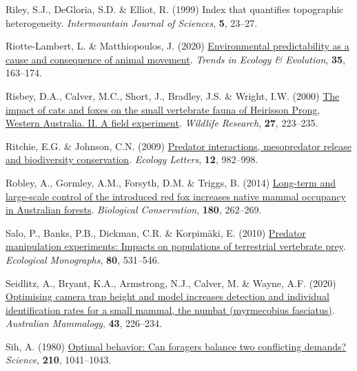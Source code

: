 \documentclass[preprint, 3p, authoryear]{elsarticle} %
\newlength{\cslhangindent}
\newlength{\cslentryspacingunit} %
\newenvironment{CSLReferences}[2] %
 {%
  \setlength{\parindent}{0pt}
  \ifodd #1
  \let\oldpar\par
  \def\par{\hangindent=\cslhangindent\oldpar}
  \fi
  \setlength{\parskip}{#2\cslentryspacingunit}
 }%
 {}
\begin{document}
\begin{CSLReferences}{1}{0}
\leavevmode{}%
Riley, S.J., DeGloria, S.D. \& Elliot, R. (1999) Index that quantifies topographic heterogeneity. \emph{Intermountain Journal of Sciences}, \textbf{5}, 23--27.

\leavevmode{}%
Riotte-Lambert, L. \& Matthiopoulos, J. (2020) \href{https://doi.org/10.1016/j.tree.2019.09.009}{Environmental predictability as a cause and consequence of animal movement}. \emph{Trends in Ecology \& Evolution}, \textbf{35}, 163--174.

\leavevmode{}%
Risbey, D.A., Calver, M.C., Short, J., Bradley, J.S. \& Wright, I.W. (2000) \href{https://doi.org/10.1071/WR98092}{The impact of cats and foxes on the small vertebrate fauna of {Heirisson Prong, Western {A}ustralia. II. A} field experiment}. \emph{Wildlife Research}, \textbf{27}, 223--235.

\leavevmode{}%
Ritchie, E.G. \& Johnson, C.N. (2009) \href{https://doi.org/10.1111/j.1461-0248.2009.01347.x}{Predator interactions, mesopredator release and biodiversity conservation}. \emph{Ecology Letters}, \textbf{12}, 982--998.

\leavevmode{}%
Robley, A., Gormley, A.M., Forsyth, D.M. \& Triggs, B. (2014) \href{https://doi.org/10.1016/j.biocon.2014.10.017}{Long-term and large-scale control of the introduced red fox increases native mammal occupancy in {{A}ustralian} forests}. \emph{Biological Conservation}, \textbf{180}, 262--269.

\leavevmode{}%
Salo, P., Banks, P.B., Dickman, C.R. \& Korpimäki, E. (2010) \href{https://doi.org/10.1890/09-1260.1}{Predator manipulation experiments: Impacts on populations of terrestrial vertebrate prey}. \emph{Ecological Monographs}, \textbf{80}, 531--546.

\leavevmode{}%
Seidlitz, A., Bryant, K.A., Armstrong, N.J., Calver, M. \& Wayne, A.F. (2020) \href{https://doi.org/10.1071/AM20020}{Optimising camera trap height and model increases detection and individual identification rates for a small mammal, the numbat (myrmecobius fasciatus)}. \emph{Australian Mammalogy}, \textbf{43}, 226--234.

\leavevmode{}%
Sih, A. (1980) \href{https://doi.org/10.1126/science.210.4473.1041}{Optimal behavior: Can foragers balance two conflicting demands?} \emph{Science}, \textbf{210}, 1041--1043.


\end{CSLReferences}
\end{document}
